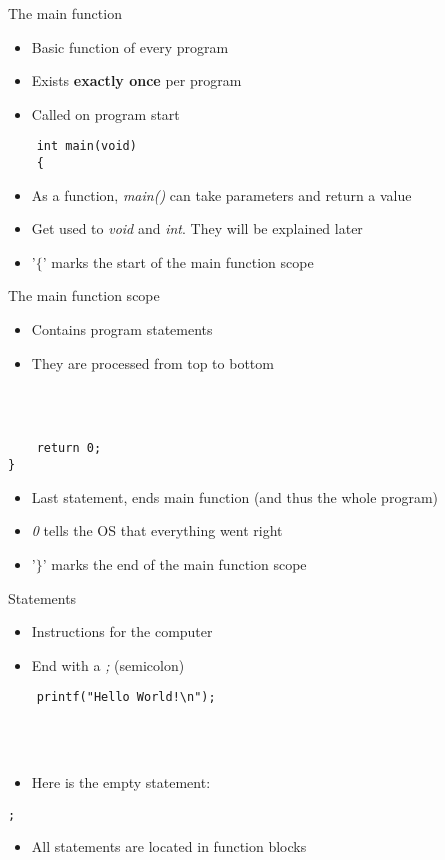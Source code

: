 \begin{frame}[fragile]{The main function}
	\begin{itemize}
		\item Basic function of every program
		\item Exists \textbf{exactly once} per program
		\item Called on program start
	\end{itemize}
	\begin{lstlisting}
	int main(void)
 	{
\end{lstlisting}
	\begin{itemize}
		\item As a function, \textit{main()} can take parameters and return a value
		\item Get used to \textit{void} and \textit{int}. They will be explained later
		\item '$\lbrace$' marks the start of the main function scope
	\end{itemize}
\end{frame}
\begin{frame}[fragile]{The main function scope}
	\begin{itemize}
		\item Contains program statements
		\item They are processed from top to bottom
	\end{itemize} \ \\
	\ \\
	\begin{lstlisting}
	return 0;
}
\end{lstlisting}
	\begin{itemize}
		\item Last statement, ends main function (and thus the whole program)
		\item \textit{0} tells the OS that everything went right
		\item '$\rbrace$' marks the end of the main function scope
	\end{itemize}
\end{frame}

\begin{frame}[fragile]{Statements}
	\begin{itemize}
		\item Instructions for the computer
		\item End with a \textit{;} (semicolon)
	\end{itemize}
	\begin{lstlisting}
	printf("Hello World!\n");
\end{lstlisting} \ \\ \ \\
	\begin{itemize}
		\item Here is the empty statement:
	\end{itemize}
	\begin{lstlisting}[numbers=none]
	;
\end{lstlisting}
	\begin{itemize}
		\item All statements are located in function blocks
	\end{itemize}
\end{frame}

